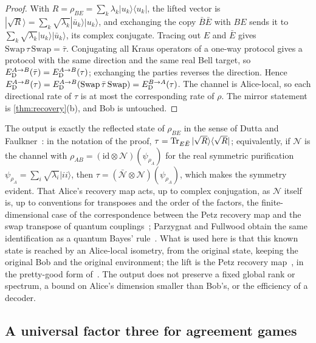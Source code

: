 \begin{proof}
With $R=\rho_{BE}=\sum_k\lambda_k|u_k\rangle\langle u_k|$, the lifted vector is $|\sqrt R\rangle=\sum_k\sqrt{\lambda_k}|\bar u_k\rangle|u_k\rangle$,
and exchanging the copy $\bar B\bar E$ with $BE$ sends it to $\sum_k\sqrt{\lambda_k}|u_k\rangle|\bar u_k\rangle$, its complex
conjugate. Tracing out $E$ and $\bar E$ gives $\mathrm{Swap}\,\tau\,\mathrm{Swap}=\bar\tau$. Conjugating all Kraus operators of
a one-way protocol gives a protocol with the same direction and the same real Bell target, so $E_{\mathrm D}^{A\to B}(\bar\tau)=
E_{\mathrm D}^{A\to B}(\tau)$; exchanging the parties reverses the direction. Hence $E_{\mathrm D}^{A\to B}(\tau)=E_{\mathrm D}^{A\to B}(\mathrm{Swap}\,\bar\tau\,
\mathrm{Swap})=E_{\mathrm D}^{B\to A}(\tau)$. The channel is Alice-local, so each directional rate of $\tau$ is at most the
corresponding rate of $\rho$. The mirror statement is \cref{thm:recovery}(b), and Bob is untouched.
\end{proof}

The output is exactly the reflected state of $\rho_{BE}$ in the sense of Dutta and Faulkner~\cite{DF19}: in the notation of
the proof, $\tau=\operatorname{Tr}_{E\bar E}|\sqrt R\rangle\langle\sqrt R|$; equivalently, if $\mathcal N$ is the channel with
$\rho_{AB}=(\mathrm{id}\otimes\mathcal N)(\psi_{\rho_A})$ for the real symmetric purification $\psi_{\rho_A}=\sum_i\sqrt{\lambda_i}|ii\rangle$,
then $\tau=(\bar{\mathcal N}\otimes\mathcal N)(\psi_{\rho_A})$, which makes the symmetry evident. That Alice's recovery map acts,
up to complex conjugation, as $\mathcal N$ itself is, up to conventions for transposes and the order of the factors, the
finite-dimensional case of the correspondence between the Petz recovery map and the swap transpose of quantum
couplings~\cite[Theorem~1]{BPTV25}; Parzygnat and Fullwood obtain the same identification as a quantum Bayes'
rule~\cite[(14) and (25)]{PF23}. What is used here is that this known state is reached by an Alice-local isometry, from the
original state, keeping the original Bob and the original environment; the lift is the Petz recovery map~\cite{Petz86}, in the
pretty-good form of~\cite{BK02,BCW14,IRS17,Ren17}. The output does not preserve a fixed global rank or
spectrum, a bound on Alice's dimension smaller than Bob's, or the efficiency of a decoder.

\subsection{A universal factor three for agreement games}\label{sec:factor-three}

